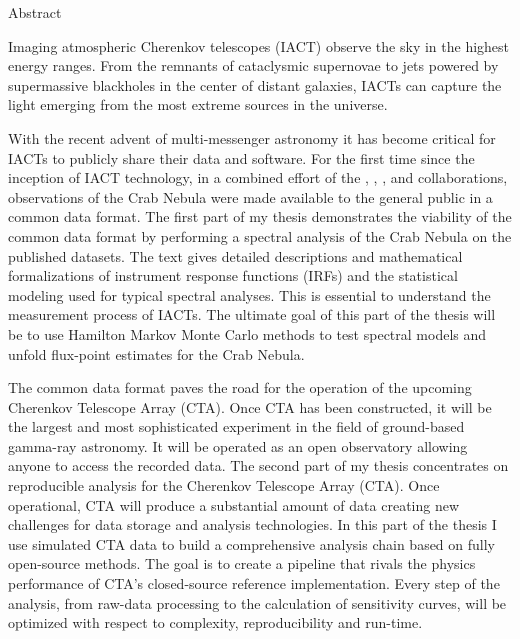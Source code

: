 \begin{center}
  \large{Abstract}
\end{center}
%
\noindent

Imaging atmospheric Cherenkov telescopes (IACT) observe the sky in the highest energy ranges. 
From the remnants of cataclysmic supernovae to jets powered by supermassive blackholes in the center of distant galaxies,
IACTs can capture the light emerging from the most extreme sources in the universe. 

With the recent advent of multi-messenger astronomy it has become critical for IACTs to publicly share their data and software.
For the first time since the inception of IACT technology, in a combined effort of the \hess, \magic, \veritas, and \fact collaborations,
observations of the Crab Nebula were made available to the general public in a common data format. 
The first part of my thesis demonstrates the viability of the common data format 
by performing a spectral analysis of the Crab Nebula on the published datasets.
% 
The text gives detailed descriptions and mathematical formalizations of instrument response functions (IRFs) and the statistical 
modeling used for typical spectral analyses. This is essential to understand the measurement process of IACTs. 
The ultimate goal of this part of the thesis will be to use Hamilton Markov Monte Carlo methods 
to test spectral models and unfold flux-point estimates for the Crab Nebula.

The common data format paves the road for the operation of the upcoming Cherenkov Telescope Array (CTA).
Once CTA has been constructed, it will be the largest and most sophisticated experiment in the field of ground-based gamma-ray astronomy.
It will be operated as an open observatory allowing anyone to access the recorded data.
The second part of my thesis concentrates on reproducible analysis for the Cherenkov Telescope Array (CTA).
Once operational, CTA will produce a substantial amount of data creating new challenges for data storage and analysis technologies.
In this part of the thesis I use simulated CTA data to build a comprehensive analysis chain based on fully open-source methods.
The goal is to create a pipeline that rivals the physics performance of CTA's closed-source reference implementation.
Every step of the analysis, from raw-data processing to the calculation of sensitivity curves,
will be optimized with respect to complexity, reproducibility and run-time.

